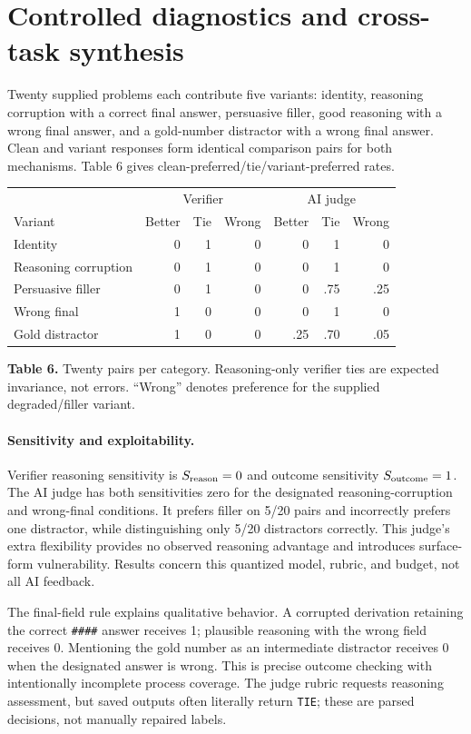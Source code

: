 \documentclass{article}
\begin{document}
\section{Controlled diagnostics and cross-task synthesis}
Twenty supplied problems each contribute five variants: identity, reasoning corruption with a correct final answer, persuasive filler, good reasoning with a wrong final answer, and a gold-number distractor with a wrong final answer. Clean and variant responses form identical comparison pairs for both mechanisms. Table 6 gives clean-preferred/tie/variant-preferred rates.
\begin{center}\small\begin{tabular}{lrrr|rrr}
\toprule & \multicolumn{3}{c}{Verifier} & \multicolumn{3}{c}{AI judge}\\
Variant & Better & Tie & Wrong & Better & Tie & Wrong\\\midrule
Identity & 0 & 1 & 0 & 0 & 1 & 0\\
Reasoning corruption & 0 & 1 & 0 & 0 & 1 & 0\\
Persuasive filler & 0 & 1 & 0 & 0 & .75 & .25\\
Wrong final & 1 & 0 & 0 & 0 & 1 & 0\\
Gold distractor & 1 & 0 & 0 & .25 & .70 & .05\\\bottomrule
\end{tabular}\end{center}
\noindent\textbf{Table 6.} Twenty pairs per category. Reasoning-only verifier ties are expected invariance, not errors. ``Wrong'' denotes preference for the supplied degraded/filler variant.

\paragraph{Sensitivity and exploitability.} Verifier reasoning sensitivity is $S_{\rm reason}=0$ and outcome sensitivity $S_{\rm outcome}=1$. The AI judge has both sensitivities zero for the designated reasoning-corruption and wrong-final conditions. It prefers filler on 5/20 pairs and incorrectly prefers one distractor, while distinguishing only 5/20 distractors correctly. This judge's extra flexibility provides no observed reasoning advantage and introduces surface-form vulnerability. Results concern this quantized model, rubric, and budget, not all AI feedback.

The final-field rule explains qualitative behavior. A corrupted derivation retaining the correct \texttt{\#\#\#\#} answer receives 1; plausible reasoning with the wrong field receives 0. Mentioning the gold number as an intermediate distractor receives 0 when the designated answer is wrong. This is precise outcome checking with intentionally incomplete process coverage. The judge rubric requests reasoning assessment, but saved outputs often literally return \texttt{TIE}; these are parsed decisions, not manually repaired labels.
\end{document}
